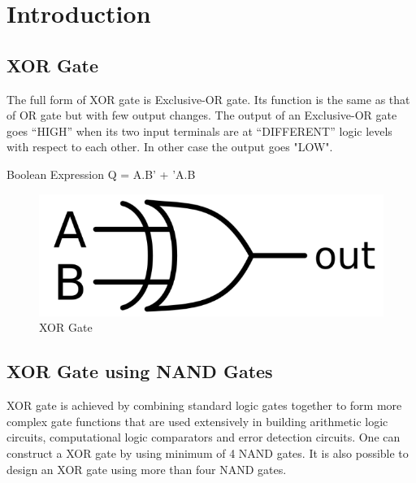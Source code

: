 \documentclass[10pt, a4paper]{article}
\title{\mytitle}
\author{\myauthor\hspace{1em}\\\contact\\\hspace{0.5em}\hspace{0.5em}\mymodule}
\date{}
\begin{document}
  \maketitle
\tableofcontents

\begin{abstract}
    This manual shows how to design 2-input XOR gate using 4 NAND gates.
\end{abstract}

\section{Introduction}
\subsection{XOR Gate}

   The full form of XOR gate is Exclusive-OR gate. Its function is the same as that of OR gate but with few output changes. The output of an Exclusive-OR gate goes “HIGH” when its two input terminals are at “DIFFERENT” logic levels with respect to each other. In other case the output goes "LOW".
        
         Boolean Expression Q = A.B' + 'A.B 
\begin{figure}[H]
    \centering
    \includegraphics[scale=0.5]{XOR Gate.png}
    \caption{XOR Gate}
    \label{fig:XOR}
\end{figure}

\subsection{XOR Gate using NAND Gates}

XOR gate is achieved by combining standard logic gates together to form more complex gate functions that are used extensively in building arithmetic logic circuits, computational logic comparators and error detection circuits. One can construct a XOR gate by using minimum of 4 NAND gates. It is also possible to design an XOR gate using more than four NAND gates. 
\end{document}
